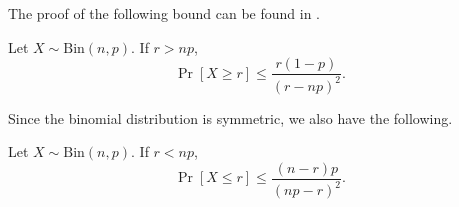 The proof of the following bound can be found in \cite[Section 6.3]{feller}.
\begin{proposition}\label{ap:prop:rightbinomtail}
    Let $X \sim \mathrm{Bin}(n, p)$. If $r > np$,
    \[ \Pr[X \geq r] \leq \frac{r(1 - p)}{(r - np)^2}.\]
\end{proposition}
Since the binomial distribution is symmetric, we also have the following.
\begin{proposition}\label{ap:prop:leftbinomtail}
    Let $X \sim \mathrm{Bin}(n, p)$. If $r < np$,
    \[ \Pr[X \leq r] \leq \frac{(n - r)p}{(np - r)^2}.\]
\end{proposition}




